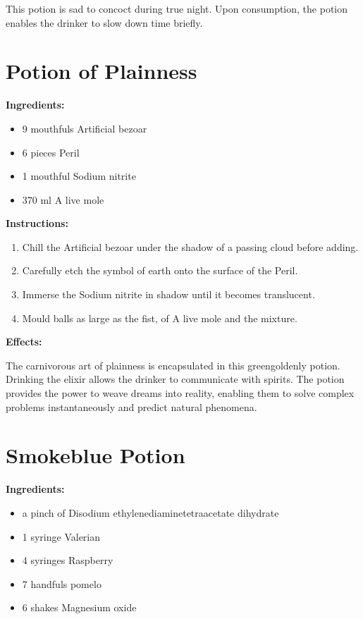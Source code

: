 \documentclass{article}
\begin{document}
This potion is sad to concoct during true night. Upon consumption, the potion enables the drinker to slow down time briefly.

\newpage
\section*{Potion of Plainness}

\textbf{Ingredients:}

\begin{itemize}
  \item 9 mouthfuls Artificial bezoar
  \item 6 pieces Peril
  \item 1 mouthful Sodium nitrite
  \item 370 ml A live mole
\end{itemize}

\textbf{Instructions:}

\begin{enumerate}
  \item Chill the Artificial bezoar under the shadow of a passing cloud before adding.
  \item Carefully etch the symbol of earth onto the surface of the Peril.
  \item Immerse the Sodium nitrite in shadow until it becomes translucent.
  \item Mould balls as large as the fist, of A live mole and the mixture.
\end{enumerate}

\textbf{Effects:}

The carnivorous art of plainness is encapsulated in this greengoldenly potion. Drinking the elixir allows the drinker to communicate with spirits. The potion provides the power to weave dreams into reality, enabling them to solve complex problems instantaneously and predict natural phenomena.

\newpage
\section*{Smokeblue Potion}

\textbf{Ingredients:}

\begin{itemize}
  \item a pinch of Disodium ethylenediaminetetraacetate dihydrate
  \item 1 syringe Valerian
  \item 4 syringes Raspberry
  \item 7 handfuls pomelo
  \item 6 shakes Magnesium oxide
\end{itemize}
\end{document}

